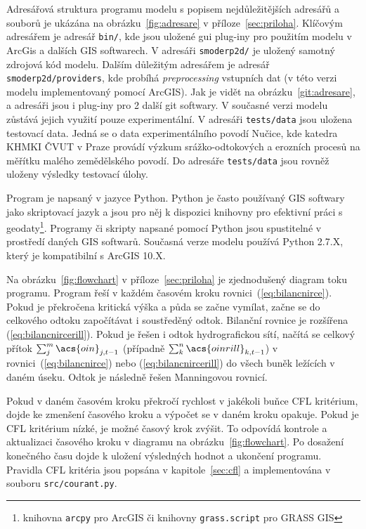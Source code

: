 Adresářová struktura programu modelu \smod s popisem nejdůležitějších adresářů 
a souborů je ukázána na obrázku~\ref{fig:adresare} v příloze~\ref{sec:priloha}. 
Klíčovým adresářem je adresář {\tt bin/}, kde jsou uložené gui plug-iny pro použitím modelu v ArcGis
a dalších GIS softwarech. V adresáři {\tt smoderp2d/} je uložený samotný zdrojová kód modelu. 
Dalším důležitým adresářem je adresář {\tt smoderp2d/providers}, kde probíhá  
{\it preprocessing} vstupních dat (v této verzi modelu implementovaný pomocí ArcGIS). 
Jak je vidět na obrázku~\ref{git:adresare}, a adresáři jsou i plug-iny pro 2 další
git softwary. V současné verzi modelu zůstává jejich využití pouze experimentální. 
V adresáři {\tt tests/data} jsou uložena testovací data. Jedná se o data experimentálního
povodí Nučice, kde katedra KHMKI ČVUT v Praze provádí výzkum srážko-odtokových a erozních procesů
na měřítku malého zemědělského povodí. Do adresáře {\tt tests/data} jsou rovněž
uloženy výsledky testovací úlohy. 


Program \smod je napsaný v jazyce Python. Python je často používaný GIS softwary jako skriptovací jazyk a jsou pro něj k dispozici knihovny pro efektivní práci s geodaty\footnote{knihovna {\tt arcpy} pro ArcGIS či knihovny {\tt grass.script} pro GRASS GIS}. Programy či skripty napsané pomocí Python jsou spustitelné v prostředí daných GIS softwarů. Současná verze modelu \smod používá Python 2.7.X, který je kompatibilní s ArcGIS 10.X.

Na obrázku~\ref{fig:flowchart} v příloze~\ref{sec:priloha} je zjednodušený diagram toku programu. Program řeší v každém časovém kroku rovnici~(\ref{eq:bilancnirce}). Pokud je překročena kritická výška a půda se začne vymílat, začne se do celkového  odtoku  započítávat i soustředěný odtok. Bilanční rovnice je rozšířena (\ref{eq:bilancnircerill}). Pokud je řešen i odtok hydrografickou sítí, načítá se celkový přítok $\sum_j^m \acs{oin}_{j,t-1}$ (případně $\sum_k^n \acs{oinrill}_{k,t-1}$) v rovnici~(\ref{eq:bilancnirce})  nebo (\ref{eq:bilancnircerill}) do všech buněk ležících v daném úseku. Odtok je následně řešen Manningovou rovnicí.

Pokud v daném časovém kroku překročí rychlost v jakékoli buňce \acs{CFL} kritérium, dojde ke zmenšení časového kroku a výpočet se v daném kroku opakuje. Pokud je \acs{CFL} kritérium nízké, je možné časový krok zvýšit. To odpovídá kontrole a aktualizaci časového kroku v diagramu na obrázku~\ref{fig:flowchart}. Po dosažení konečného času dojde k uložení výsledných hodnot a ukončení programu. Pravidla \acs{CFL} kritéria jsou popsána v kapitole~\ref{sec:cfl} a implementována v souboru {\tt src/courant.py}.





